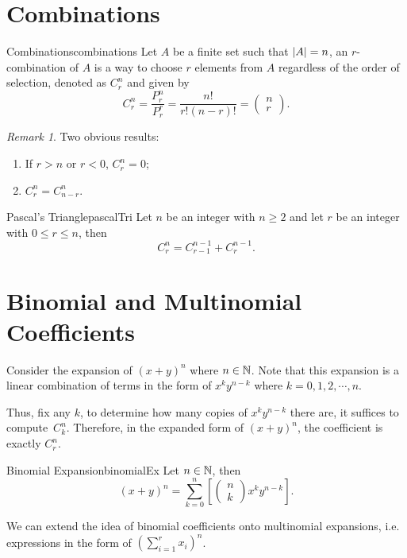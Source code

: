 \documentclass[math]{amznotes}
\theoremstyle{remark}
\newtheorem*{remark}{Remark}
\begin{document}
\section{Combinations}
\begin{dfnbox}{Combinations}{combinations}
    Let $A$ be a finite set such that ${\left\lvert {A} \right\rvert} = n$, an $r$-combination of $A$ is a way to choose $r$ elements from $A$ regardless of the order of selection, denoted as $C^n_r$ and given by
    \begin{equation*}
        C^n_r = \frac{P^n_r}{P^r_r} = \frac{n!}{r!(n - r)!} = \begin{pmatrix}
            n \\
            r
        \end{pmatrix}.
    \end{equation*}
\end{dfnbox}
\begin{notebox}
    \begin{remark}
        Two obvious results:
        \begin{enumerate}
            \item If $r > n$ or $r < 0$, $C^n_r = 0$;
            \item $C^n_r = C^n_{n - r}$.
        \end{enumerate}
    \end{remark}
\end{notebox}
\begin{thmbox}{Pascal's Triangle}{pascalTri}
    Let $n$ be an integer with $n \geq 2$ and let $r$ be an integer with $0 \leq r \leq n$, then
    \begin{equation*}
        C^n_r = C^{n - 1}_{r - 1} + C^{n - 1}_r.
    \end{equation*}
\end{thmbox}

\section{Binomial and Multinomial Coefficients}
Consider the expansion of $(x + y)^n$ where $n \in \mathbb{N}$. Note that this expansion is a linear combination of terms in the form of $x^ky^{n - k}$ where $k = 0, 1, 2, \cdots, n$. 

Thus, fix any $k$, to determine how many copies of $x^ky^{n - k}$ there are, it suffices to compute~$C^n_k$. Therefore, in the expanded form of $(x + y)^n$, the coefficient is exactly $C^n_r$.
\begin{thmbox}{Binomial Expansion}{binomialEx}
    Let $n \in \mathbb{N}$, then
    \begin{equation*}
        (x + y)^n = \sum_{k = 0}^n \left[\begin{pmatrix}
            n \\
            k
        \end{pmatrix}x^ky^{n - k}\right].
    \end{equation*}
\end{thmbox}
We can extend the idea of binomial coefficients onto multinomial expansions, i.e. expressions in the form of $\left(\sum_{i = 1}^{r}x_i\right)^n$.
\end{document}
